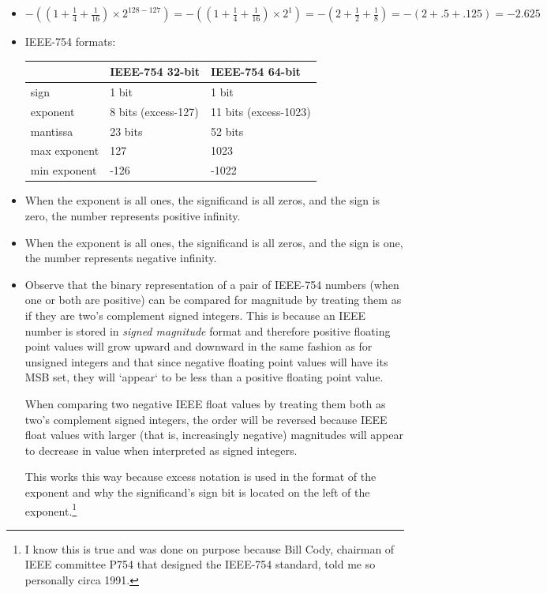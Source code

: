 \begin{itemize}
\item $-((1 + \frac{1}{4} + \frac{1}{16}) \times 2^{128-127}) = -((1 + \frac{1}{4} + \frac{1}{16}) \times 2^1) = -(2 + \frac{1}{2} + \frac{1}{8}) = -(2 + .5 + .125) = -2.625$

\item IEEE-754 formats:

\begin{tabular}{|l|l|l|}
\hline
				& IEEE-754 32-bit	& IEEE-754 64-bit	\\
\hline
sign			& 1 bit				& 1 bit			\\
exponent		& 8 bits (excess-127)			& 11 bits (excess-1023)		\\
mantissa		& 23 bits			& 52 bits		\\
max exponent	& 127				& 1023			\\
min exponent	& -126				& -1022			\\
\hline
\end{tabular}

\item When the exponent is all ones, the significand is all zeros, and
the sign is zero, the number represents positive infinity.

\item When the exponent is all ones, the significand is all zeros, and
the sign is one, the number represents negative infinity.

\item Observe that the binary representation of a pair of IEEE-754 numbers
(when one or both are positive) can be compared for magnitude
by treating them as if they are two's complement signed integers.
This is because an IEEE number is stored in {\em signed magnitude} format and
therefore positive floating point values will grow upward and downward in the
same fashion as for unsigned integers and that since negative floating point
values will have its MSB set, they will `appear` to be less than a positive
floating point value.

When comparing two negative IEEE float values by treating them both as two's
complement signed integers, the order will be reversed because IEEE float values
with larger (that is, increasingly negative) magnitudes will appear to decrease
in value when interpreted as signed integers.

This works this way because excess notation is used in the format of the
exponent and why the significand's sign bit is located on the left of
the exponent.\footnote{I know this is true and was done on purpose because
Bill Cody, chairman of IEEE committee P754 that designed the IEEE-754 standard,
told me so personally circa 1991.}


\end{itemize}
